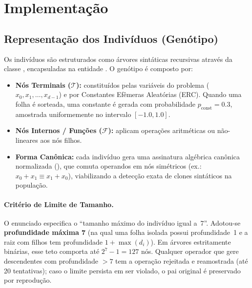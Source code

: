 \section{Implementação}
\label{sec:implementacao}

\subsection{Representação dos Indivíduos (Genótipo)}
\label{sec:impl_representacao}

Os indivíduos são estruturados como árvores sintáticas recursivas através da
classe , encapsuladas na entidade
. O genótipo é composto por:

\begin{itemize}
  \item \textbf{Nós Terminais ($\mathcal{T}$):} constituídos pelas variáveis
        do problema ($x_0, x_1, \dots, x_{d-1}$) e por Constantes Efêmeras
        Aleatórias (ERC). Quando uma folha é sorteada, uma constante é
        gerada com probabilidade $p_{\text{const}} = 0.3$, amostrada
        uniformemente no intervalo $[-1.0, 1.0]$.
  \item \textbf{Nós Internos / Funções ($\mathcal{F}$):} aplicam operações
        aritméticas ou não-lineares aos nós filhos.
  \item \textbf{Forma Canônica:} cada indivíduo gera uma assinatura
        algébrica canônica normalizada (\allowbreak{}), que comuta operandos
        em nós simétricos (ex.: $x_0 + x_1 \equiv x_1 + x_0$), viabilizando a
        detecção exata de clones sintáticos na população.
\end{itemize}

\paragraph{Critério de Limite de Tamanho.}
O enunciado especifica o ``tamanho máximo do indivíduo igual a~7''.
Adotou-se \textbf{profundidade máxima 7} (na qual uma folha isolada possui
profundidade~1 e a raiz com filhos tem profundidade $1 + \max(d_i)$). Em
árvores estritamente binárias, esse teto comporta até $2^7 - 1 = 127$ nós.
Qualquer operador que gere descendentes com profundidade $>7$ tem a operação
rejeitada e reamostrada (até 20 tentativas); caso o limite persista em ser
violado, o pai original é preservado por reprodução.

